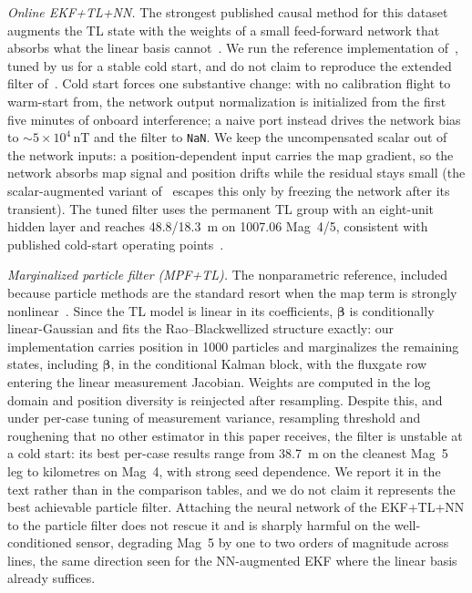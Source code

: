 \emph{Online EKF+TL+NN.} The strongest published causal method for this
dataset augments the TL state with the weights of a small feed-forward network
that absorbs what the linear basis cannot~\cite{gnadt2022,hager2026}. We run
the reference implementation of~\cite{gnadt2022}, tuned by us for a stable cold
start, and do not claim to reproduce the extended filter of~\cite{hager2026}.
Cold start forces one substantive change: with no calibration flight to
warm-start from, the network output normalization is initialized from the first
five minutes of onboard interference; a naive port instead drives the network
bias to $\sim\!5\times10^{4}$\,\si{\nano\tesla} and the filter to \texttt{NaN}.
We keep the uncompensated scalar out of the network inputs: a
position-dependent input carries the map gradient, so the network absorbs map
signal and position drifts while the residual stays small (the scalar-augmented
variant of~\cite{hager2026} escapes this only by freezing the network after its
transient). The tuned filter uses the permanent TL group with an eight-unit
hidden layer and reaches \num{48.8}/\SI{18.3}{\meter} on 1007.06 Mag~4/5,
consistent with published cold-start operating
points~\cite{gnadt2022,hager2026}.

\emph{Marginalized particle filter (MPF+TL).} The nonparametric reference,
included because particle methods are the standard resort when the map term is
strongly nonlinear~\cite{nordlund2009,park2024}. Since the TL model is linear
in its coefficients, $\boldsymbol{\beta}$ is conditionally linear-Gaussian and
fits the Rao--Blackwellized structure exactly: our implementation carries
position in \num{1000} particles and marginalizes the remaining states,
including $\boldsymbol{\beta}$, in the conditional Kalman block, with the
fluxgate row entering the linear measurement Jacobian. Weights are computed in
the log domain and position diversity is reinjected after resampling. Despite
this, and under per-case tuning of measurement variance, resampling threshold
and roughening that no other estimator in this paper receives, the filter is
unstable at a cold start: its best per-case results range from
\SI{38.7}{\meter} on the cleanest Mag~5 leg to kilometres on Mag~4, with strong
seed dependence. We report it in the text rather than in the comparison tables,
and we do not claim it represents the best achievable particle filter.
Attaching the neural network of the EKF+TL+NN to the particle filter does not
rescue it and is sharply harmful on the well-conditioned sensor, degrading
Mag~5 by one to two orders of magnitude across lines, the same direction seen
for the NN-augmented EKF where the linear basis already suffices.
